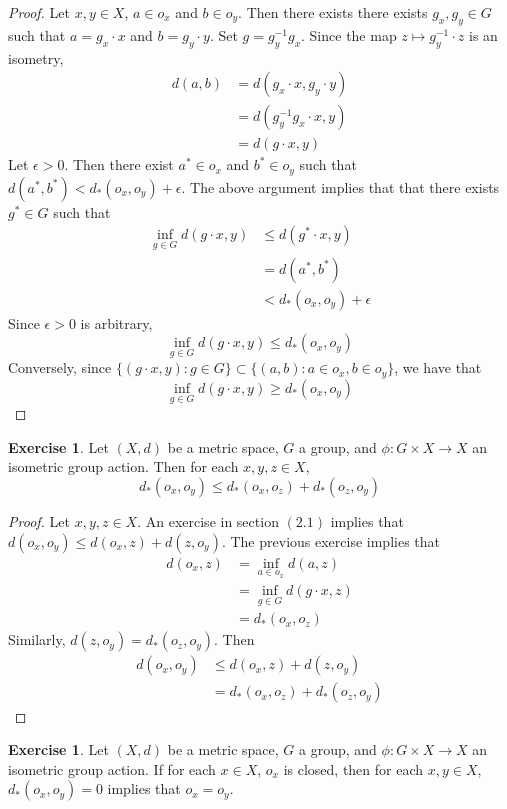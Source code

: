 \documentclass[12pt]{amsart}
\theoremstyle{definition}
\newtheorem{ex}[definition]{Exercise}
\newcommand{\ep}{\epsilon}
\newcommand{\lex}[1]{\label{ex:#1}}
\begin{document}
	\begin{proof}
	Let $x, y \in X$, $a \in o_x$ and $b \in o_y$. Then there exists there exists $g_x, g_y \in G$ such that $a = g_x \cdot x$ and $b = g_y \cdot y$. Set $g = g_y^{-1}g_x$. Since the map $z \mapsto g_y^{-1} \cdot z$ is an isometry, 
	\begin{align*}
	d(a,b) 
	&= d(g_x \cdot x, g_y \cdot y) \\
	&= d(g_y^{-1}g_x \cdot x, y)\\
	&= d(g\cdot x, y)
	\end{align*}
	Let $\ep >0$. Then there exist $a^* \in o_x$ and $b^* \in o_y$ such that $d(a^*,b^*) < d_*(o_x,o_y) + \ep$. The above argument implies that that there exists $g^* \in G$ such that 
	\begin{align*} 
	\inf_{g \in G} d(g \cdot x, y) 
	& \leq d(g^* \cdot x, y) \\
	&= d(a^*, b^*) \\
	& < d_*(o_x, o_y) + \ep
\end{align*}	 
	Since $\ep >0$ is arbitrary, $$\inf_{g \in G} d(g \cdot x, y) \leq d_*(o_x, o_y)$$
	Conversely, since $\{(g \cdot x, y): g \in G\} \subset \{(a,b): a \in o_x, b \in o_y\}$, we have that 
	$$\inf_{g \in G} d(g \cdot x, y) \geq d_*(o_x, o_y)$$ 
	\end{proof}
	
	\begin{ex} \lex{}
	Let $(X, d)$ be a metric space, $G$ a group, and $\phi: G \times X \rightarrow X$ an isometric group action. Then for each $x, y, z \in X$, $$d_*(o_x, o_y) \leq d_*(o_x, o_z) + d_*(o_z, o_y)$$
	\end{ex}
	
	\begin{proof}
	Let $x, y, z \in X$. An exercise in section $(2.1)$ implies that $d(o_x, o_y) \leq d(o_x, z) + d(z, o_y)$. The previous exercise implies that 
	\begin{align*}
	d(o_x, z) 
	&= \inf_{a \in o_x} d(a, z) \\
	&= \inf_{g \in G} d(g \cdot x, z) \\
	&= d_*(o_x, o_z)
	\end{align*}
	Similarly, $d(z, o_y) = d_*(o_z, o_y)$. Then 
	\begin{align*}
	d(o_x, o_y) 
	&\leq d(o_x, z) + d(z, o_y) \\
	&= d_*(o_x, o_z) + d_*(o_z, o_y)
	\end{align*}
	\end{proof}
	
	\begin{ex} \lex{}
	Let $(X, d)$ be a metric space, $G$ a group, and $\phi: G \times X \rightarrow X$ an isometric group action. If for each $x \in X$, $o_x$ is closed, then for each $x, y \in X$, $d_*(o_x, o_y) =0$ implies that $o_x = o_y$.
	\end{ex}
	
\end{document}
